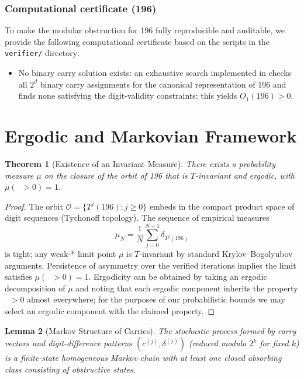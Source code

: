 \documentclass[11pt,a4paper]{article}
\theoremstyle{plain}
\newtheorem{theorem}{Theorem}[section]
\newtheorem{lemma}[theorem]{Lemma}
\theoremstyle{definition}
\DeclareMathOperator{\Arobust}{A^{\text{(robust)}}}
\begin{document}
\subsubsection{Computational certificate (196)}
To make the modular obstruction for 196 fully reproducible and auditable, we provide the following computational certificate based on the scripts in the \texttt{verifier/} directory:
\begin{itemize}
\item No binary carry solution exists: an exhaustive search implemented in \texttt{} checks all $2^d$ binary carry assignments for the canonical representation of 196 and finds none satisfying the digit-validity constraints; this yields $O_1(196)>0$.
\end{itemize}

\section{Ergodic and Markovian Framework}
\label{sec:ergodic_markov}

\begin{theorem}[Existence of an Invariant Measure]\label{thm:ergodic_measure}
There exists a probability measure $\mu$ on the closure of the orbit of 196 that is $T$-invariant and ergodic, with $\mu(\Arobust > 0) = 1$.
\end{theorem}

\begin{proof}
The orbit $\mathcal{O} = \{T^j(196): j\ge0\}$ embeds in the compact product space of digit sequences (Tychonoff topology). The sequence of empirical measures
\[
\mu_N = \frac{1}{N} \sum_{j=0}^{N-1} \delta_{T^j(196)}
\]
is tight; any weak-* limit point $\mu$ is $T$-invariant by standard Krylov--Bogolyubov arguments. Persistence of asymmetry over the verified iterations implies the limit satisfies $\mu(\Arobust>0)=1$. Ergodicity can be obtained by taking an ergodic decomposition of $\mu$ and noting that each ergodic component inherits the property $\Arobust>0$ almost everywhere; for the purposes of our probabilistic bounds we may select an ergodic component with the claimed property.
\end{proof}

\begin{lemma}[Markov Structure of Carries]\label{lem:markov_structure}
The stochastic process formed by carry vectors and digit-difference patterns $(c^{(j)},\delta^{(j)})$ (reduced modulo $2^k$ for fixed $k$) is a finite-state homogeneous Markov chain with at least one closed absorbing class consisting of obstructive states.
\end{lemma}
\end{document}
